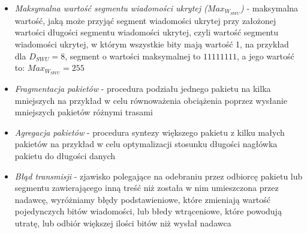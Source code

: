 \documentclass[a4paper, twoside, 12pt]{report}
\begin{document}
\begin{itemize}
       \item \emph{Maksymalna wartość segmentu wiadomości ukrytej (\( Max_{W_{SWU}} \))} -
           maksymalna wartość, jaką może przyjąć segment wiadomości ukrytej przy
           założonej wartości długości segmentu wiadomości ukrytej, czyli wartość
           segmentu wiadomości ukrytej, w którym wszystkie bity mają wartość 1,
           na przykład dla \( D_{SWU} = 8 \), segment o wartości maksymalnej to
           \( 11111111 \), a jego wartość to: \( Max_{W_{SWU}} = 255 \)

       \item \emph{Fragmentacja pakietów} - procedura podziału jednego pakietu na
           kilka mniejszych na przykład w celu równoważenia obciążenia poprzez
           wysłanie mniejszych pakietów różnymi trasami

       \item \emph{Agregacja pakietów} - procedura syntezy większego pakietu z
           kilku małych pakietów na przykład w celu optymalizacji stosunku długości
           nagłówka pakietu do długości danych

       \item \emph{Błąd transmisji} - zjawisko polegające na odebraniu przez odbiorcę
           pakietu lub segmentu zawierającego inną treść niż została w nim
           umieszczona przez nadawcę, wyróżniamy błędy podstawieniowe, które
           zmieniają wartość pojedynczych bitów wiadomości, lub błedy wtrąceniowe,
           które powodują utratę, lub odbiór większej ilości bitów niż wysłał nadawca

    \end{itemize}
\end{document}
